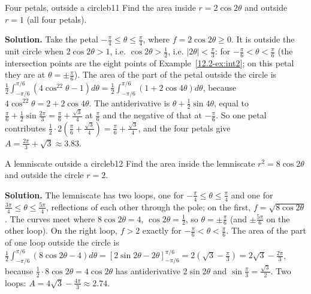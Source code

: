 \documentclass[11pt]{article}
\begin{document}
\begin{exmp}{Four petals, outside a circle}{b11}
Find the area inside $r=2\cos2\theta$ and outside $r=1$ (all four petals).

\textbf{Solution.} Take the petal $-\frac\pi4\le\theta\le\frac\pi4$, where $f=2\cos2\theta\ge0$. It is outside the unit circle when $2\cos2\theta>1$, i.e. $\cos2\theta>\frac12$, i.e. $|2\theta|<\frac\pi3$: for $-\frac\pi6<\theta<\frac\pi6$ (the intersection points are the eight points of Example~\ref{12.2-ex:int2}; on this petal they are at $\theta=\pm\frac\pi6$). The area of the part of the petal outside the circle is $\frac12\int_{-\pi/6}^{\pi/6}\left(4\cos^22\theta-1\right)d\theta=\frac12\int_{-\pi/6}^{\pi/6}\left(1+2\cos4\theta\right)d\theta$, because $4\cos^22\theta=2+2\cos4\theta$. The antiderivative is $\theta+\frac12\sin4\theta$, equal to $\frac\pi6+\frac12\sin\frac{2\pi}3=\frac\pi6+\frac{\sqrt3}4$ at $\frac\pi6$ and the negative of that at $-\frac\pi6$. So one petal contributes $\frac12\cdot2\left(\frac\pi6+\frac{\sqrt3}4\right)=\frac\pi6+\frac{\sqrt3}4$, and the four petals give $A=\frac{2\pi}3+\sqrt3\approx3.83$.
\end{exmp}

\begin{exmp}{A lemniscate outside a circle}{b12}
Find the area inside the lemniscate $r^2=8\cos2\theta$ and outside the circle $r=2$.

\textbf{Solution.} The lemniscate has two loops, one for $-\frac\pi4\le\theta\le\frac\pi4$ and one for $\frac{3\pi}4\le\theta\le\frac{5\pi}4$, reflections of each other through the pole; on the first, $f=\sqrt{8\cos2\theta}$. The curves meet where $8\cos2\theta=4$, $\cos2\theta=\frac12$, so $\theta=\pm\frac\pi6$ (and $\pm\frac{5\pi}6$ on the other loop). On the right loop, $f>2$ exactly for $-\frac\pi6<\theta<\frac\pi6$. The area of the part of one loop outside the circle is $\frac12\int_{-\pi/6}^{\pi/6}\left(8\cos2\theta-4\right)d\theta=\left[2\sin2\theta-2\theta\right]_{-\pi/6}^{\pi/6}=2\left(\sqrt3-\frac\pi3\right)=2\sqrt3-\frac{2\pi}3$, because $\frac12\cdot8\cos2\theta=4\cos2\theta$ has antiderivative $2\sin2\theta$ and $\sin\frac\pi3=\frac{\sqrt3}2$. Two loops: $A=4\sqrt3-\frac{4\pi}3\approx2.74$.
\end{exmp}
\end{document}
